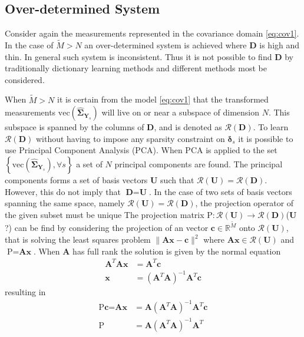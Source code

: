 \subsection{Over-determined System}\label{sec:over_det}
Consider again the measurements represented in the covariance domain \eqref{eq:cov1}.
In the case of $\widetilde{M} > N$ an over-determined system is achieved where $\textbf{D}$ is high and thin. In general such system is inconsistent. Thus it is not possible to find $\textbf{D}$ by traditionally dictionary learning methods and different methods most be considered.

When $ \widetilde{M} > N $ it is certain from the model \eqref{eq:cov1} that the transformed measurements $\text{vec}(\widehat{\boldsymbol{\Sigma}}_{\textbf{Y}_s})$ will live on or near a subspace of dimension $N$. 
This subspace is spanned by the columns of $\textbf{D}$, and is denoted as $\mathcal{R}(\textbf{D})$. 
To learn $\mathcal{R}(\textbf{D})$ without having to impose any sparsity constraint on $\boldsymbol{\delta}_s$ it is possible to use Principal Component Analysis (PCA). 
When PCA is applied to the set $\left\{\text{vec}(\widehat{\boldsymbol{\Sigma}}_{\textbf{Y}_s}), \forall s \right\}$ a set of $N$ principal components are found. The principal components forms a set of basis vectors $\textbf{U}$ such that $\mathcal{R}(\textbf{U})=\mathcal{R}(\textbf{D})$. 
However, this do not imply that $\textbf{D}=\textbf{U}$. 
In the case of two sets of basis vectors spanning the same space, namely $\mathcal{R}(\textbf{U})=\mathcal{R}(\textbf{D})$, the projection operator of the given subset must be unique  
The projection matrix $\text{P}:\mathcal{R}(\textbf{U})\rightarrow \mathcal{R}(\textbf{D})$($\textbf{U}$?) can be find by considering the projection of an vector $\textbf{c}\in \mathbb{R}^{\widetilde{M}}$ onto $\mathcal{R}(\textbf{U})$, that is solving the least squares problem $\| \textbf{Ax}-\textbf{c}\|^{2}$ where $\textbf{Ax}\in \mathcal{R}(\textbf{U})$ and $\text{P} = \textbf{Ax}$. When $\textbf{A}$ has full rank the solution is given by the normal equation
\begin{align*}
\textbf{A}^T\textbf{A}\textbf{x} &= \textbf{A}^T\textbf{c}\\
\textbf{x} &= (\textbf{A}^T\textbf{A})^{-1}\textbf{A}^T\textbf{c}
\end{align*}	
resulting in
\begin{align*}
\text{P}\textbf{c} = \textbf{Ax} &= \textbf{A}(\textbf{A}^T\textbf{A})^{-1}\textbf{A}^T\textbf{c}\\
\text{P} &= \textbf{A}(\textbf{A}^T\textbf{A})^{-1}\textbf{A}^T 
\end{align*} 
